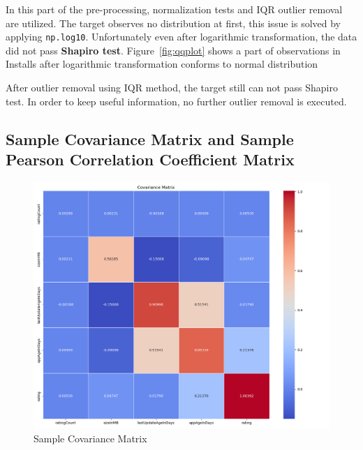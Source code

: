 In this part of the pre-processing, normalization tests and IQR outlier removal are utilized. The target observes no distribution at first, this issue is solved by applying \texttt{np.log10}. Unfortunately even after logarithmic transformation, the data did not pass \textbf{Shapiro test}. Figure~\ref{fig:qqplot} shows a part of observations in Installs after logarithmic transformation conforms to normal distribution 

After outlier removal using IQR method, the target still can not pass Shapiro test. In order to keep useful information, no further outlier removal is executed.



\subsection{Sample Covariance Matrix and Sample Pearson Correlation Coefficient Matrix}

\begin{figure}[h]
    \centering
    \includegraphics[width=\textwidth]{docs//assets/cov.png}
    \caption{Sample Covariance Matrix}
    \label{fig:cov}
\end{figure}

